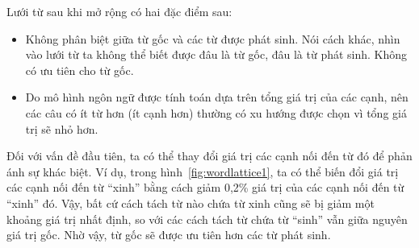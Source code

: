\documentclass[a4paper,oneside,14pt]{extbook} %
\newcommand{\note}[1]{\underline{#1}}
\begin{document}


Lưới từ sau khi mở rộng có hai đặc điểm sau:
\begin{itemize}
\item Không phân biệt giữa từ gốc và các từ được phát sinh. Nói cách
  khác, nhìn vào lưới từ ta không thể biết được đâu là từ gốc, đâu là
  từ phát sinh. Không có ưu tiên cho từ gốc.
\item Do mô hình ngôn ngữ được tính toán dựa trên tổng giá trị của các
  cạnh, nên các câu có ít từ hơn (ít cạnh hơn) thường có xu hướng được
  chọn vì tổng giá trị sẽ nhỏ hơn.
\end{itemize}

Đối với vấn đề đầu tiên, ta có thể thay đổi giá trị các cạnh nối đến
từ đó để phản ánh sự khác biệt. Ví dụ, trong
hình~\ref{fig:wordlattice1}, ta có thể biến đổi giá trị các cạnh nối
đến từ ``xinh'' bằng cách giảm 0,2\% giá trị của các cạnh nối đến từ
``xinh'' đó. Vậy, bất cứ cách tách từ nào chứa từ xinh cũng sẽ bị giảm
một khoảng giá trị nhất định, so với các cách tách từ chứa từ ``sinh''
vẫn giữa nguyên giá trị gốc. Nhờ vậy, từ gốc sẽ được ưu tiên hơn các
từ phát sinh.
\end{document}
